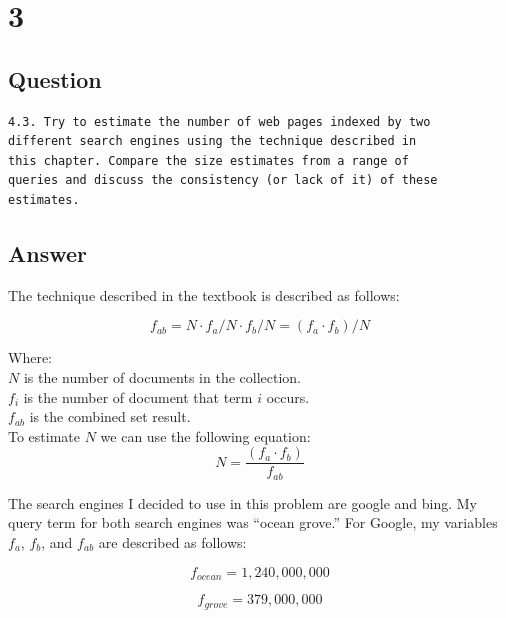 \documentclass[letterpaper,11pt]{article}
\begin{document}
\section*{3}

\subsection*{Question}

\begin{verbatim}
4.3. Try to estimate the number of web pages indexed by two 
different search engines using the technique described in 
this chapter. Compare the size estimates from a range of 
queries and discuss the consistency (or lack of it) of these estimates.
\end{verbatim}

\subsection*{Answer}

The technique described in the textbook \cite{book} is described as follows:

\begin{equation}\label{eq:est}
  f_{ab} = N \cdot f_a/N \cdot f_b/N = (f_a \cdot f_b)/N
\end{equation}

Where:\\
$N$ is the number of documents in the collection.\\
$f_i$ is the number of document that term $i$ occurs.\\
$f_{ab}$ is the combined set result.\\

To estimate $N$ we can use the following equation:
\begin{equation}
	N = \frac{(f_a \cdot f_b)}{f_{ab}}
\end{equation}

The search engines I decided to use in this problem are google and bing. 
My query term for both search engines was ``ocean grove.''
For Google, my variables $f_{a}$, $f_{b}$, and $f_{ab}$ are described as follows:

\begin{equation*}
	f_{ocean} = 1,240,000,000
\end{equation*}

\begin{equation*}
	f_{grove} = 379,000,000
\end{equation*}
\end{document}
